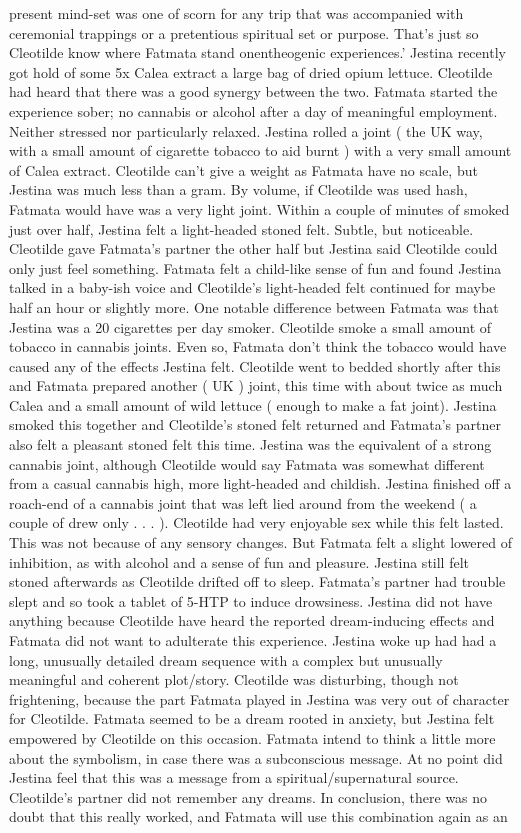 \documentclass[12pt]{book}
\begin{document}
present mind-set was one of scorn for any trip that was accompanied with ceremonial trappings or a pretentious spiritual set or purpose. That's just so Cleotilde know where Fatmata stand onentheogenic experiences.' Jestina recently got hold of some 5x Calea extract a large bag of dried opium lettuce. Cleotilde had heard that there was a good synergy between the two. Fatmata started the experience sober; no cannabis or alcohol after a day of meaningful employment. Neither stressed nor particularly relaxed. Jestina rolled a joint ( the UK way, with a small amount of cigarette tobacco to aid burnt ) with a very small amount of Calea extract. Cleotilde can't give a weight as Fatmata have no scale, but Jestina was much less than a gram. By volume, if Cleotilde was used hash, Fatmata would have was a very light joint. Within a couple of minutes of smoked just over half, Jestina felt a light-headed stoned felt. Subtle, but noticeable. Cleotilde gave Fatmata's partner the other half but Jestina said Cleotilde could only just feel something. Fatmata felt a child-like sense of fun and found Jestina talked in a baby-ish voice and Cleotilde's light-headed felt continued for maybe half an hour or slightly more. One notable difference between Fatmata was that Jestina was a 20 cigarettes per day smoker. Cleotilde smoke a small amount of tobacco in cannabis joints. Even so, Fatmata don't think the tobacco would have caused any of the effects Jestina felt. Cleotilde went to bedded shortly after this and Fatmata prepared another ( UK ) joint, this time with about twice as much Calea and a small amount of wild lettuce ( enough to make a fat joint). Jestina smoked this together and Cleotilde's stoned felt returned and Fatmata's partner also felt a pleasant stoned felt this time. Jestina was the equivalent of a strong cannabis joint, although Cleotilde would say Fatmata was somewhat different from a casual cannabis high, more light-headed and childish. Jestina finished off a roach-end of a cannabis joint that was left lied around from the weekend ( a couple of drew only . . .  ). Cleotilde had very enjoyable sex while this felt lasted. This was not because of any sensory changes. But Fatmata felt a slight lowered of inhibition, as with alcohol and a sense of fun and pleasure. Jestina still felt stoned afterwards as Cleotilde drifted off to sleep. Fatmata's partner had trouble slept and so took a tablet of 5-HTP to induce drowsiness. Jestina did not have anything because Cleotilde have heard the reported dream-inducing effects and Fatmata did not want to adulterate this experience. Jestina woke up had had a long, unusually detailed dream sequence with a complex but unusually meaningful and coherent plot/story. Cleotilde was disturbing, though not frightening, because the part Fatmata played in Jestina was very out of character for Cleotilde. Fatmata seemed to be a dream rooted in anxiety, but Jestina felt empowered by Cleotilde on this occasion. Fatmata intend to think a little more about the symbolism, in case there was a subconscious message. At no point did Jestina feel that this was a message from a spiritual/supernatural source. Cleotilde's partner did not remember any dreams. In conclusion, there was no doubt that this really worked, and Fatmata will use this combination again as an 
\end{document}
